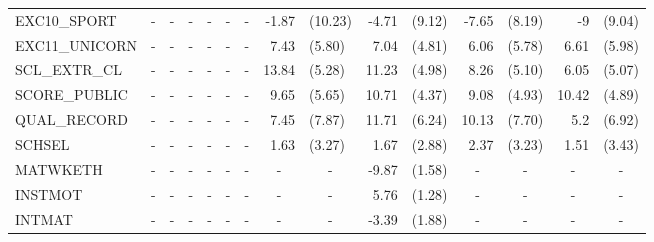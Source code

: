 \documentclass[10pt]{article}
\begin{document}
\begin{table}[htbp]
\begin{tabular}{lrlrlrlrlrlrlrl}
EXC10\_SPORT & \multicolumn{1}{c}{-} & \multicolumn{1}{c}{-} & \multicolumn{1}{c}{-} & \multicolumn{1}{c}{-} & \multicolumn{1}{c}{-} & \multicolumn{1}{c}{-} & -1.87 & (10.23) & -4.71 & (9.12) & -7.65 & (8.19) & -9    & (9.04) \\[0.2em]
EXC11\_UNICORN & \multicolumn{1}{c}{-} & \multicolumn{1}{c}{-} & \multicolumn{1}{c}{-} & \multicolumn{1}{c}{-} & \multicolumn{1}{c}{-} & \multicolumn{1}{c}{-} & 7.43  & (5.80) & 7.04  & (4.81) & 6.06  & (5.78) & 6.61  & (5.98) \\[0.2em]
SCL\_EXTR\_CL & \multicolumn{1}{c}{-} & \multicolumn{1}{c}{-} & \multicolumn{1}{c}{-} & \multicolumn{1}{c}{-} & \multicolumn{1}{c}{-} & \multicolumn{1}{c}{-} & 13.84 & (5.28) & 11.23 & (4.98) & 8.26  & (5.10) & 6.05  & (5.07) \\[0.2em]
SCORE\_PUBLIC & \multicolumn{1}{c}{-} & \multicolumn{1}{c}{-} & \multicolumn{1}{c}{-} & \multicolumn{1}{c}{-} & \multicolumn{1}{c}{-} & \multicolumn{1}{c}{-} & 9.65  & (5.65) & 10.71 & (4.37) & 9.08  & (4.93) & 10.42 & (4.89) \\[0.2em]
QUAL\_RECORD & \multicolumn{1}{c}{-} & \multicolumn{1}{c}{-} & \multicolumn{1}{c}{-} & \multicolumn{1}{c}{-} & \multicolumn{1}{c}{-} & \multicolumn{1}{c}{-} & 7.45  & (7.87) & 11.71 & (6.24) & 10.13 & (7.70) & 5.2   & (6.92) \\[0.2em]
SCHSEL & \multicolumn{1}{c}{-} & \multicolumn{1}{c}{-} & \multicolumn{1}{c}{-} & \multicolumn{1}{c}{-} & \multicolumn{1}{c}{-} & \multicolumn{1}{c}{-} & 1.63  & (3.27) & 1.67  & (2.88) & 2.37  & (3.23) & 1.51  & (3.43) \\[0.2em]
MATWKETH & \multicolumn{1}{c}{-} & \multicolumn{1}{c}{-} & \multicolumn{1}{c}{-} & \multicolumn{1}{c}{-} & \multicolumn{1}{c}{-} & \multicolumn{1}{c}{-} & \multicolumn{1}{c}{-} & \multicolumn{1}{c}{-} & -9.87 & (1.58) & \multicolumn{1}{c}{-} & \multicolumn{1}{c}{-} & \multicolumn{1}{c}{-} & \multicolumn{1}{c}{-} \\[0.2em]
INSTMOT & \multicolumn{1}{c}{-} & \multicolumn{1}{c}{-} & \multicolumn{1}{c}{-} & \multicolumn{1}{c}{-} & \multicolumn{1}{c}{-} & \multicolumn{1}{c}{-} & \multicolumn{1}{c}{-} & \multicolumn{1}{c}{-} & 5.76  & (1.28) & \multicolumn{1}{c}{-} & \multicolumn{1}{c}{-} & \multicolumn{1}{c}{-} & \multicolumn{1}{c}{-} \\[0.2em]
INTMAT & \multicolumn{1}{c}{-} & \multicolumn{1}{c}{-} & \multicolumn{1}{c}{-} & \multicolumn{1}{c}{-} & \multicolumn{1}{c}{-} & \multicolumn{1}{c}{-} & \multicolumn{1}{c}{-} & \multicolumn{1}{c}{-} & -3.39 & (1.88) & \multicolumn{1}{c}{-} & \multicolumn{1}{c}{-} & \multicolumn{1}{c}{-} & \multicolumn{1}{c}{-} \\[0.2em]

\end{tabular}
\end{table}
\end{document}
